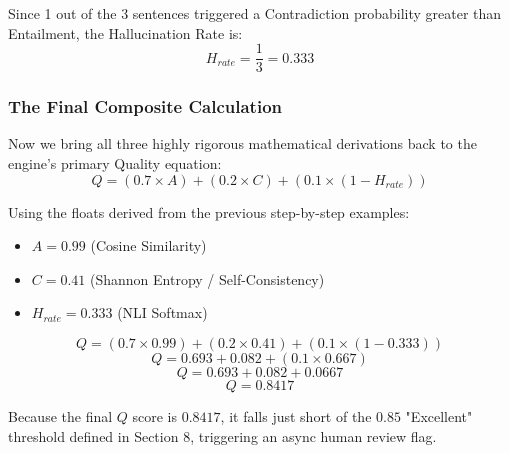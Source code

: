 \documentclass[11pt,a4paper]{article}
\begin{document}
Since 1 out of the 3 sentences triggered a Contradiction probability greater than Entailment, the Hallucination Rate is:
\[ H_{rate} = \frac{1}{3} = \mathbf{0.333} \]

\vspace{0.5cm}

\subsubsection{The Final Composite Calculation}

Now we bring all three highly rigorous mathematical derivations back to the engine's primary Quality equation:
\[ Q = (0.7 \times A) + (0.2 \times C) + (0.1 \times (1 - H_{rate})) \]

Using the floats derived from the previous step-by-step examples:
\begin{itemize}
    \item $A = 0.99$ (Cosine Similarity)
    \item $C = 0.41$ (Shannon Entropy / Self-Consistency)
    \item $H_{rate} = 0.333$ (NLI Softmax)
\end{itemize}

\[ Q = (0.7 \times 0.99) + (0.2 \times 0.41) + (0.1 \times (1 - 0.333)) \]
\[ Q = 0.693 + 0.082 + (0.1 \times 0.667) \]
\[ Q = 0.693 + 0.082 + 0.0667 \]
\[ Q = \mathbf{0.8417} \]

Because the final $Q$ score is $0.8417$, it falls just short of the $0.85$ "Excellent" threshold defined in Section 8, triggering an async human review flag.
\end{document}
